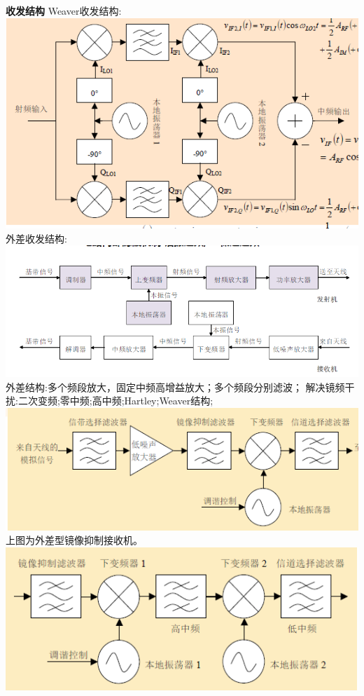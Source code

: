 \documentclass[10.5pt,landscape]{article}
\begin{document}
\begin{multicols*}{4}
 \textbf{收发结构}
Weaver收发结构:\newline
 \includegraphics[scale=0.4]{Weaver}\newline
 外差收发结构: \newline
 \includegraphics[scale=0.4]{外差接收}\newline
 外差结构:多个频段放大，固定中频高增益放大；多个频段分别滤波；\newline
 解决镜频干扰:二次变频;零中频;高中频;Hartley;Weaver结构; \newline
  \includegraphics[scale=0.5]{镜像抑制结构}\newline
  上图为外差型镜像抑制接收机。 \newline
   \includegraphics[scale=0.5]{二次变频}\newline

\end{multicols*}
\end{document}
